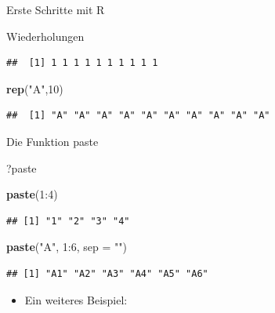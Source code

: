 \documentclass[ignorenonframetext,]{beamer}
\newenvironment{Shaded}{}{}
\newcommand{\KeywordTok}[1]{\textcolor[rgb]{0.00,0.44,0.13}{\textbf{{#1}}}}
\newcommand{\DataTypeTok}[1]{\textcolor[rgb]{0.56,0.13,0.00}{{#1}}}
\newcommand{\DecValTok}[1]{\textcolor[rgb]{0.25,0.63,0.44}{{#1}}}
\newcommand{\StringTok}[1]{\textcolor[rgb]{0.25,0.44,0.63}{{#1}}}
\newcommand{\NormalTok}[1]{{#1}}
\providecommand{\tightlist}{%
\setlength{\itemsep}{0pt}\setlength{\parskip}{0pt}}
\begin{document}
\begin{frame}[fragile]{Erste Schritte mit R}
\begin{block}{Wiederholungen}
\begin{verbatim}
##  [1] 1 1 1 1 1 1 1 1 1 1
\end{verbatim}

\begin{Shaded}
\begin{Highlighting}[]
\KeywordTok{rep}\NormalTok{(}\StringTok{"A"}\NormalTok{,}\DecValTok{10}\NormalTok{)}
\end{Highlighting}
\end{Shaded}

\begin{verbatim}
##  [1] "A" "A" "A" "A" "A" "A" "A" "A" "A" "A"
\end{verbatim}

\end{block}

\begin{block}{Die Funktion paste}

\begin{Shaded}
\begin{Highlighting}[]
\NormalTok{?paste}
\end{Highlighting}
\end{Shaded}

\begin{Shaded}
\begin{Highlighting}[]
\KeywordTok{paste}\NormalTok{(}\DecValTok{1}\NormalTok{:}\DecValTok{4}\NormalTok{)}
\end{Highlighting}
\end{Shaded}

\begin{verbatim}
## [1] "1" "2" "3" "4"
\end{verbatim}

\begin{Shaded}
\begin{Highlighting}[]
\KeywordTok{paste}\NormalTok{(}\StringTok{"A"}\NormalTok{, }\DecValTok{1}\NormalTok{:}\DecValTok{6}\NormalTok{, }\DataTypeTok{sep =} \StringTok{""}\NormalTok{)}
\end{Highlighting}
\end{Shaded}

\begin{verbatim}
## [1] "A1" "A2" "A3" "A4" "A5" "A6"
\end{verbatim}

\begin{itemize}
\tightlist
\item
  Ein weiteres Beispiel:
\end{itemize}


\end{block}
\end{frame}
\end{document}
